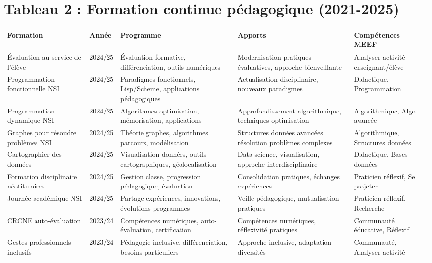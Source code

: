 \section{Tableau 2 : Formation continue pédagogique (2021-2025)}

\begin{center}
\tiny
\begin{tabular}{|p{2.5cm}|p{1cm}|p{2.5cm}|p{2.5cm}|p{2.5cm}|}
\hline
\textbf{Formation} & \textbf{Année} & \textbf{Programme} & \textbf{Apports} & \textbf{Compétences MEEF} \\
\hline
Évaluation au service de l'élève & 2024/25 & Évaluation formative, différenciation, outils numériques & Modernisation pratiques évaluatives, approche bienveillante & Analyser activité enseignant/élève \\
\hline
Programmation fonctionnelle NSI & 2024/25 & Paradigmes fonctionnels, Lisp/Scheme, applications pédagogiques & Actualisation disciplinaire, nouveaux paradigmes & Didactique, Programmation \\
\hline
Programmation dynamique NSI & 2024/25 & Algorithmes optimisation, mémorisation, applications & Approfondissement algorithmique, techniques optimisation & Algorithmique, Algo avancée \\
\hline
Graphes pour résoudre problèmes NSI & 2024/25 & Théorie graphes, algorithmes parcours, modélisation & Structures données avancées, résolution problèmes complexes & Algorithmique, Structures données \\
\hline
Cartographier des données & 2024/25 & Visualisation données, outils cartographiques, géolocalisation & Data science, visualisation, approche interdisciplinaire & Didactique, Bases données \\
\hline
Formation disciplinaire néotitulaires & 2024/25 & Gestion classe, progression pédagogique, évaluation & Consolidation pratiques, échanges expériences & Praticien réflexif, Se projeter \\
\hline
Journée académique NSI & 2024/25 & Partage expériences, innovations, évolutions programmes & Veille pédagogique, mutualisation pratiques & Praticien réflexif, Recherche \\
\hline
CRCNE auto-évaluation & 2023/24 & Compétences numériques, auto-évaluation, certification & Compétences numériques, réflexivité pratiques & Communauté éducative, Réflexif \\
\hline
Gestes professionnels inclusifs & 2023/24 & Pédagogie inclusive, différenciation, besoins particuliers & Approche inclusive, adaptation diversités & Communauté, Analyser activité \\

\end{tabular}
\end{center}

